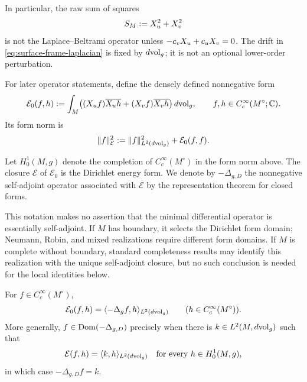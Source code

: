In particular, the raw sum of squares
\begin{equation}\label{eq:surface-raw-sum-squares}
 S_M:=X_u^2+X_v^2
\end{equation}
is not the Laplace--Beltrami operator unless
$-c_vX_u+c_uX_v=0$.  The drift in
\eqref{eq:surface-frame-laplacian} is fixed by $d\mathrm{vol}_g$; it is not an
optional lower-order perturbation.

For later operator statements, define the densely defined nonnegative form
\begin{equation}\label{eq:surface-dirichlet-preform}
 \mathcal E_0(f,h)
 :=\int_M
 \bigl((X_u f)\overline{X_u h}
       +(X_v f)\overline{X_v h}\bigr)\,d\mathrm{vol}_g,
 \qquad
 f,h\in C_c^\infty(M^\circ;\mathbb{C}).
\end{equation}
Its form norm is
\[
 \|f\|_{\mathcal E}^2
 :=\|f\|_{L^2(d\mathrm{vol}_g)}^2+\mathcal E_0(f,f).
\]

\begin{definition}
\label{def:surface-energy-domain}
Let $H_0^1(M,g)$ denote the completion of
$C_c^\infty(M^\circ)$ in the form norm above.  The closure
$\mathcal E$ of $\mathcal E_0$ is the Dirichlet energy form.  We denote by
$-\Delta_{g,D}$ the nonnegative self-adjoint operator associated with
$\mathcal E$ by the representation theorem for closed forms.
\end{definition}

This notation makes no assertion that the minimal differential operator is
essentially self-adjoint.  If $M$ has boundary, it selects the Dirichlet form
domain; Neumann, Robin, and mixed realizations require different form domains.
If $M$ is complete without boundary, standard completeness results may identify
this realization with the unique self-adjoint closure, but no such conclusion is
needed for the local identities below.

\begin{proposition}
\label{prop:surface-weak-operator-meanings}
For $f\in C_c^\infty(M^\circ)$,
\begin{equation}\label{eq:surface-green-identity-compact-support}
 \mathcal E_0(f,h)
 =\langle-\Delta_gf,h\rangle_{L^2(d\mathrm{vol}_g)}
 \qquad
 (h\in C_c^\infty(M^\circ)).
\end{equation}
More generally, $f\in\operatorname{Dom}(-\Delta_{g,D})$ precisely when there is
$k\in L^2(M,d\mathrm{vol}_g)$ such that
\[
 \mathcal E(f,h)=\langle k,h\rangle_{L^2(d\mathrm{vol}_g)}
 \quad\text{for every }h\in H_0^1(M,g),
\]
in which case $-\Delta_{g,D}f=k$.
\end{proposition}

